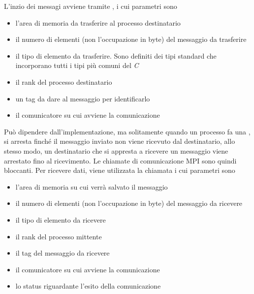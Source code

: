 \documentclass[10pt, letterpaper]{report}
\begin{document}
L'inzio dei messagi avviene tramite , i cui parametri sono\begin{itemize}
    \item {} l'area di memoria da trasferire al processo destinatario 
    \item {} il numero di elementi (non l'occupazione in byte) del messaggio da trasferire 
    \item {} il tipo di elemento da trasferire. Sono definiti dei tipi standard che 
    incorporano tutti i tipi più comuni del \textit{C}
    \item {} il rank del processo destinatario
    \item {} un tag da dare al messaggio per identificarlo 
    \item {} il comunicatore  su cui avviene la comunicazione
\end{itemize}
Può dipendere dall'implementazione, ma solitamente quando un processo fa una , si arresta finché 
il messaggio inviato non viene ricevuto dal destinatario, allo stesso modo, un destinatario che si appresta a ricevere 
un messaggio viene arrestato fino al ricevimento. Le chiamate di comunicazione MPI sono quindi bloccanti. \acc 
Per ricevere dati, viene utilizzata la chiamata   i cui parametri sono\begin{itemize}
    \item {} l'area di memoria su cui verrà salvato il messaggio 
    \item {} il numero di elementi (non l'occupazione in byte) del messaggio da ricevere 
    \item  {} il tipo di elemento da ricevere
    \item {} il rank del processo mittente
    \item {} il tag del messaggio da ricevere
    \item {} il comunicatore su cui avviene la comunicazione
    \item {} lo status riguardante l'esito della comunicazione
\end{itemize}
\end{document}
